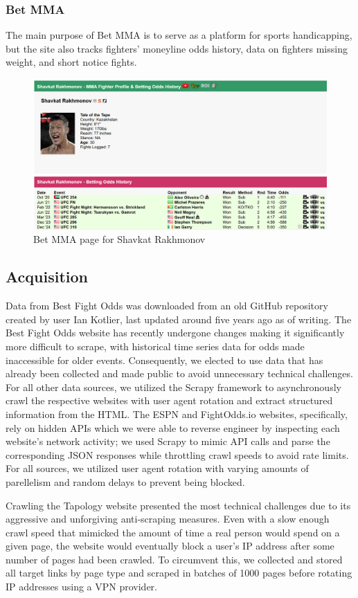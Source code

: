 \documentclass[12pt,twoside]{report}
\begin{document}
\subsubsection{Bet MMA}

The main purpose of Bet MMA is to serve as a platform for sports handicapping, but the site also tracks fighters' moneyline odds history, data on fighters missing weight, and short notice fights.

\begin{figure}[htb]
    \centering
    \includegraphics[width=0.5\linewidth]{figures/betmma1.png}
    \caption{Bet MMA page for Shavkat Rakhmonov}
\end{figure}


\subsection{Acquisition}

Data from Best Fight Odds was downloaded from an old GitHub repository created by user Ian Kotlier, last updated around five years ago as of writing. The Best Fight Odds website has recently undergone changes making it significantly more difficult to scrape, with historical time series data for odds made inaccessible for older events. Consequently, we elected to use data that has already been collected and made public to avoid unnecessary technical challenges. For all other data sources, we utilized the Scrapy framework to asynchronously crawl the respective websites with user agent rotation and extract structured information from the HTML. The ESPN and FightOdds.io websites, specifically, rely on hidden APIs which we were able to reverse engineer by inspecting each website's network activity; we used Scrapy to mimic API calls and parse the corresponding JSON responses while throttling crawl speeds to avoid rate limits. For all sources, we utilized user agent rotation with varying amounts of parellelism and random delays to prevent being blocked.

Crawling the Tapology website presented the most technical challenges due to its aggressive and unforgiving anti-scraping measures. Even with a slow enough crawl speed that mimicked the amount of time a real person would spend on a given page, the website would eventually block a user's IP address after some number of pages had been crawled. To circumvent this, we collected and stored all target links by page type and scraped in batches of 1000 pages before rotating IP addresses using a VPN provider.
\end{document}
